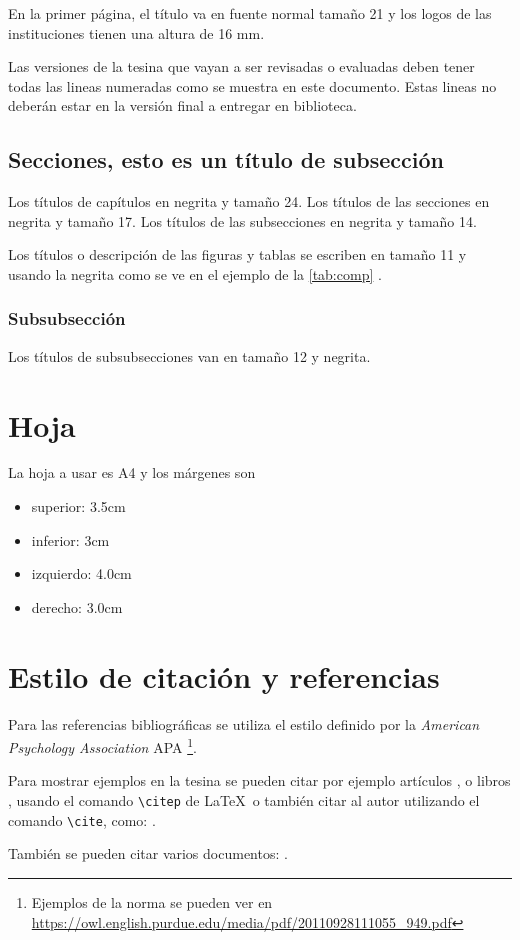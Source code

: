 En la primer página, el título va en fuente normal tamaño 21 y los logos de las instituciones tienen una altura de 16 mm.

Las versiones de la tesina que vayan a ser revisadas o evaluadas deben tener todas las lineas numeradas como se muestra en este documento. %
%
Estas lineas no deberán estar en la versión final a entregar en biblioteca.

\subsection{Secciones, esto es un título de subsección}


Los títulos de capítulos en negrita y tamaño 24. %
%
Los títulos de las secciones en negrita y tamaño 17.
%
Los títulos de las subsecciones en negrita y tamaño 14.

Los títulos o descripción de las figuras y tablas se escriben en tamaño 11 y usando la negrita como se ve en el ejemplo de la \autoref{tab:comp} .

\subsubsection{Subsubsección}

Los títulos de subsubsecciones van en tamaño 12 y negrita.

\section{Hoja}

La hoja a usar es A4 y los márgenes son 

\begin{itemize}
  \item superior: 3.5cm
  \item inferior: 3cm
  \item izquierdo: 4.0cm
  \item derecho: 3.0cm
\end{itemize}


\section{Estilo de citación y referencias}

Para las referencias bibliográficas se utiliza el estilo definido por la \textit{American Psychology Association} APA \footnote{Ejemplos de la norma se pueden ver en \url{https://owl.english.purdue.edu/media/pdf/20110928111055_949.pdf}}.

Para mostrar ejemplos en la tesina se pueden citar por ejemplo artículos \citep{article-example}, o libros \citep{book-example}, usando el comando \verb|\citep| de \LaTeX \, o también citar al autor utilizando el comando \verb|\cite|, como: \cite{article-example}.

También se pueden citar varios documentos: \citep{Rosati2008,Krour2013,LeMagorou2002}.


